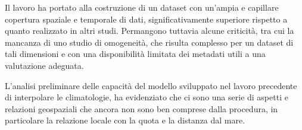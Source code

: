 Il lavoro ha portato alla costruzione di un dataset con un'ampia e capillare copertura spaziale e temporale di dati, significativamente superiore rispetto a quanto realizzato in altri studi. Permangono tuttavia alcune criticità, tra cui la mancanza di uno studio di omogeneità, che risulta complesso per un dataset di tali dimensioni e con una disponibilità limitata dei metadati utili a una valutazione adeguata.

L'analisi preliminare delle capacità del modello sviluppato nel lavoro precedente di interpolare le climatologie, ha evidenziato che ci sono una serie di aspetti e relazioni geospaziali che ancora non sono ben comprese dalla procedura, in particolare la relazione locale con la quota e la distanza dal mare.